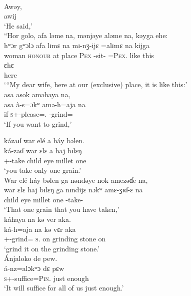 \clearpage
\ea \label{ex:8:29}\\
Awəy,\\      
  awij\\
\glt  ‘He said,’\\
\medskip
“Hor  golo,  afa  ləme  na,  mənjəye  aləme  na,  kəyga  ehe:\\
\gll  hʷɔr gʷɔlɔ afa lɪmɛ na mɪ-nʒ-ijɛ =alɪmɛ na kijga\\ 
      woman  \textsc{honour}   {at place}   \textsc{Pex}   {\PSP} {\NOM}{}-sit-{\CL} =\textsc{Pex}.{\POSS}  {\PSP}   {like this} \\ 
      
      \medskip
\gll ɛhɛ\\
     here\\
\glt  ‘“My dear wife, here at our (exclusive) place, it is like this:’\\
\medskip
asa  asok  aməhaya  na,\\
\gll  asa à-s=ɔkʷ amə-h=aja na\\
      if   \textsc{s}+{\PFV}-please={\twoS}.{\IO}   {\DEP}-grind={\PLU}   {\PSP}\\
\glt ‘If you want to grind,’
      
\medskip
kázaɗ  war  elé  a  háy  bəlen.\\  
\gll  ká-zaɗ war ɛlɛ a haj  bɪlɛŋ\\
      {\twoS}+{\IFV}-take    child    eye  {\GEN}  millet  one\\
\glt  ‘you take only one grain.’  \\

\medskip
War  elé  háy  bəlen  ga  nəndəye  nok  amezəɗe  na,\\  
\gll  war ɛlɛ haj bɪlɛŋ ga nɪndijɛ nɔkʷ amɛ-ʒɪɗ{}-ɛ na\\
      child    eye  millet  one  {\ADJ}  {\DEM}    {\twoS}    {\DEP}-take-{\CL}  {\PSP} \\ 
\glt ‘That one grain that you have taken,’\\      
      
\medskip
káhaya  na  kə  ver  aka.\\   
\gll  ká-h=aja na kə vɛr aka\\
      {\twoS}+{\IFV}-grind={\PLU} \textsc{s}.{\DO} on {grinding stone} on\\
\glt  ‘grind it on the grinding stone.’\\

\medskip
Ánjaloko  de  pew.\\ 
\gll  á-nz=alɔkʷɔ dɛ pɛw \\
      \textsc{s}+{\IFV}-suffice=\textsc{Pin}.{\IO}  just   enough\\
\glt  ‘It will suffice for all of us just enough.’\\

